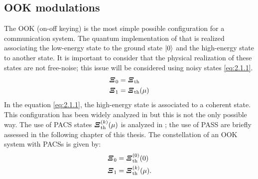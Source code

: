     \subsection{OOK modulations}
        The OOK (on-off keying) is the most simple possible configuration for a communication system.
        The quantum implementation of that is realized associating the low-energy state to the 
        ground state $\ket{0}$ and the high-energy state to another state. It is important to
        consider that the physical realization of these states are not free-noise; this issue will be
        considered using noisy states \ref{eq:2.1.1}.
        \begin{subequations}\begin{align}
            \bm{\relax{\varXi}}_0 &= \bm{\relax{\varXi}}_{\mathrm{th}}\\
            \bm{\relax{\varXi}}_1 &= \bm{\relax{\varXi}}_{\mathrm{th}}(\mu)
            \label{eq:2.1.1}
        \end{align}\end{subequations}
        In the equation \ref{eq:2.1.1}, the high-energy state is associated to a coherent state. This 
        configuration has been widely analyzed in \cite{helstrom1,helstrom2,coherentComm1,coherentComm2,
        coherentComm3,coherentComm4} but this is not the only possible way. The use of PACS states 
        $\bm{\relax{\varXi}}_{\mathrm{th}}^{(k)}(\mu)$ is analyzed in \cite{PACSDisc,tesiGuerrini}; the use of PASS are briefly
        assessed in the following chapter of this thesis.
        The constellation of an OOK system with PACSs is given by:
        \begin{subequations}\begin{align}
            \bm{\relax{\varXi}}_0 &= \bm{\relax{\varXi}}_{\mathrm{th}}^{(0)}(0)\\
            \bm{\relax{\varXi}}_1 &= \bm{\relax{\varXi}}_{\mathrm{th}}^{(k)}(\mu).
            \label{eq:2.1.15}
        \end{align}\end{subequations}

